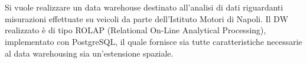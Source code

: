 \chapter*{}
Si vuole realizzare un data warehouse destinato all’analisi di dati riguardanti misurazioni effettuate su veicoli da parte dell’Istituto Motori di Napoli.
Il DW realizzato è di tipo ROLAP (Relational On-Line Analytical
Processing), implementato con PostgreSQL, il quale fornisce sia
tutte caratteristiche necessarie al data warehousing sia un’estensione spaziale.